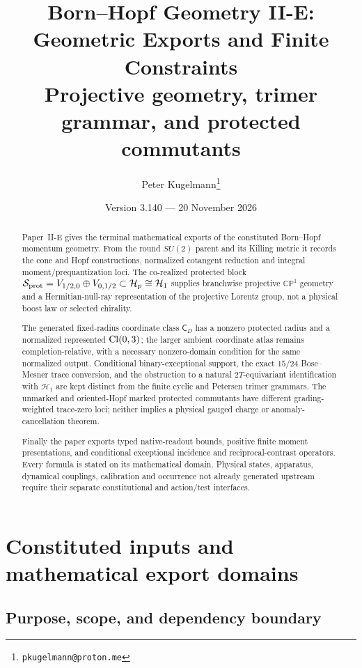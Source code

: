 \documentclass[12pt,a4paper]{article}
\title{\textbf{Born--Hopf Geometry II-E: Geometric Exports and Finite Constraints}\\[0.5em]
\large Projective geometry, trimer grammar, and protected commutants}
\author{Peter Kugelmann\thanks{\texttt{pkugelmann@proton.me}}}
\date{Version 3.140 --- 20 November 2026}
\begin{document}
\maketitle

\begin{abstract}
Paper~II-E gives the terminal mathematical exports of the constituted
Born--Hopf momentum geometry.  From the round $SU(2)$ parent and its
Killing metric it records the cone and Hopf constructions, normalized
cotangent reduction and integral moment/prequantization loci.  The
co-realized protected block
$\mathcal S_{\rm prot}=V_{1/2,0}\oplus V_{0,1/2}\subset\mathcal H_p\cong\mathcal H_1$
supplies branchwise projective $\mathbb{CP}^{1}$ geometry and a
Hermitian-null-ray representation of the projective Lorentz group,
not a physical boost law or selected chirality.

The generated fixed-radius coordinate class $\mathsf C_D$ has a nonzero
protected radius and a normalized represented $\operatorname{Cl}(0,3)$; the larger
ambient coordinate atlas remains completion-relative, with a necessary
nonzero-domain condition for the same normalized output.  Conditional
binary-exceptional support, the exact $15/24$ Bose--Mesner trace conversion,
and the obstruction to a natural $2T$-equivariant identification with
$\mathcal H_1$ are kept distinct from the finite cyclic and Petersen
trimer grammars.  The unmarked and oriented-Hopf marked protected
commutants have different grading-weighted trace-zero loci; neither
implies a physical gauged charge or anomaly-cancellation theorem.

Finally the paper exports typed native-readout bounds, positive finite
moment presentations, and conditional exceptional incidence and
reciprocal-contrast operators.  Every formula is stated on its
mathematical domain.  Physical states, apparatus, dynamical couplings,
calibration and occurrence not already generated upstream require their
separate constitutional and action/test interfaces.
\end{abstract}

\tableofcontents
\newpage

\section{Constituted inputs and mathematical export domains}
\label{paper2e:sec:organized-scope}

\subsection{Purpose, scope, and dependency boundary}
\label{p2e:sec:introduction}
\label{p2f:sec:introduction}
\end{document}
